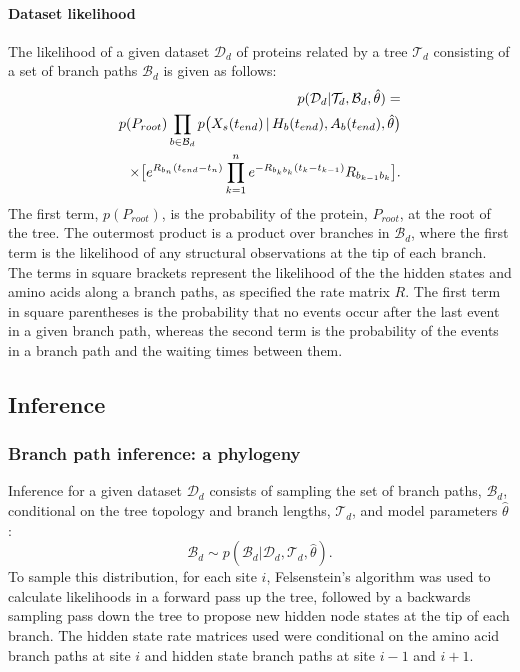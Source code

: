 \documentclass[nogrid]{MBE}%
\begin{document}
\paragraph{Dataset likelihood}
The likelihood of a given dataset $\mathcal{D}_d$ of proteins related by a tree $\mathcal{T}_d$ consisting of a set of branch paths $\mathcal{B}_d$  is given as follows:
\begin{align}
p(\mathcal{D}_d|\mathcal{T}_d,\mathcal{B}_d,\hat{\theta})=\notag\\
p(P_{root})\prod_{b \in \mathcal{B}_d} p\big(X_{s}(t_{end})\,|\,H_{b}(t_{end}),A_{b}(t_{end}),\hat{\theta}\big)\notag\\ 
\times \big[e^{R_{b_{n}}(t_{end}-t_{n})} \prod_{k=1}^{n}  e^{-R_{b_{k}b_{k}}(t_{k}-t_{k-1})} R_{b_{k-1}b_{k}} \big].
\end{align}
The first term, $p(P_{root})$, is the probability of the protein, $P_{root}$, at the root of the tree. The outermost product is a product over branches in $\mathcal{B}_d$, where the first term is the likelihood of any structural observations at the tip of each branch. The terms in square brackets represent the likelihood of the the hidden states and amino acids along a branch paths, as specified the rate matrix $R$. The first term in square parentheses is the probability that no events occur after the last event in a given branch path, whereas the second term is the probability of the events in a branch path and the waiting times between them.

\subsection{Inference}

\subsubsection{Branch path inference: a phylogeny}
Inference for a given dataset $\mathcal{D}_{d}$ consists of sampling the set of branch paths, $\mathcal{B}_{d}$, conditional on the tree topology and branch lengths, $\mathcal{T}_{d}$, and model parameters $\hat{\theta}$:
\begin{equation}
\mathcal{B}_{d} \sim p(\mathcal{B}_{d}|\mathcal{D}_{d},\mathcal{T}_d,\hat{\theta}).
\end{equation}
To sample this distribution, for each site $i$,  Felsenstein's algorithm was used to calculate likelihoods in a forward pass up the tree, followed by a backwards sampling pass down the tree to propose new hidden node states at the tip of each branch. The hidden state rate matrices used were conditional on the amino acid branch paths at site $i$ and hidden state branch paths at site $i-1$ and $i+1$.
\end{document}
